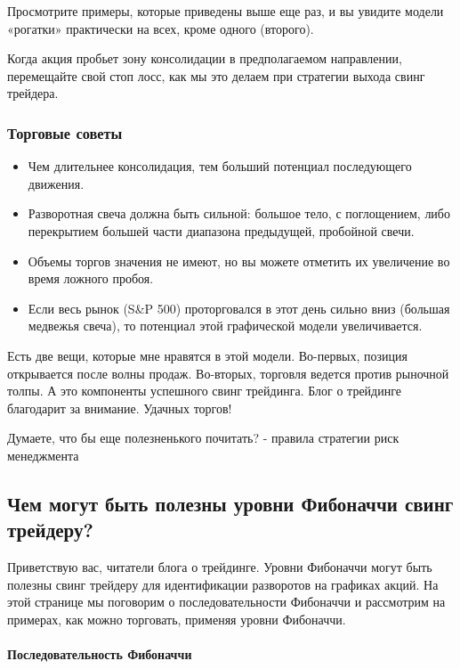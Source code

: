 \documentclass[a5paper]{article}
\begin{document}
Просмотрите примеры, которые приведены выше еще раз, и вы увидите модели «рогатки» практически на всех, кроме одного (второго).

Когда акция пробьет зону консолидации в предполагаемом направлении,
перемещайте свой стоп лосс, как мы это делаем при стратегии выхода
свинг трейдера.

\subsubsection{Торговые советы}

\begin{itemize}
\item     Чем длительнее консолидация, тем больший потенциал последующего движения.
\item     Разворотная свеча должна быть сильной: большое тело, с поглощением, либо перекрытием большей части диапазона предыдущей, пробойной свечи.
\item     Объемы торгов значения не имеют, но вы можете отметить их увеличение во время ложного пробоя.
\item     Если весь рынок (S\&P 500) проторговался в этот день сильно вниз (большая медвежья свеча), то потенциал этой графической модели увеличивается.
\end{itemize}

Есть две вещи, которые мне нравятся в этой модели. Во-первых, позиция открывается после волны продаж. Во-вторых, торговля ведется против рыночной толпы. А это компоненты успешного свинг трейдинга. Блог о трейдинге благодарит за внимание. Удачных торгов!


Думаете, что бы еще полезненького почитать? - правила стратегии риск менеджмента

\subsection{Чем могут быть полезны уровни Фибоначчи свинг трейдеру?}

Приветствую вас, читатели блога о трейдинге. Уровни Фибоначчи могут быть полезны свинг трейдеру для идентификации разворотов на графиках акций. На этой странице мы поговорим о последовательности Фибоначчи и рассмотрим на примерах, как можно торговать, применяя уровни Фибоначчи.

\paragraph{Последовательность Фибоначчи}
\end{document}
